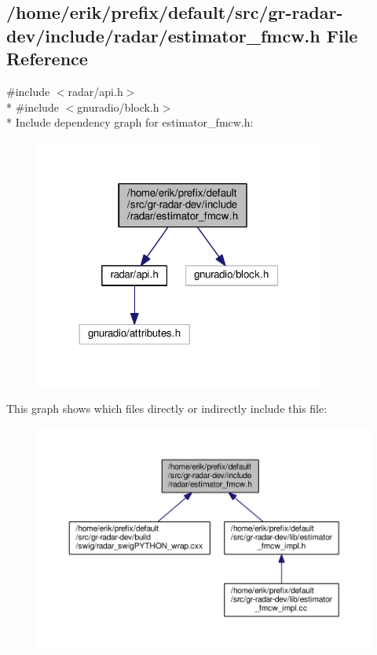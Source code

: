 \subsection{/home/erik/prefix/default/src/gr-\/radar-\/dev/include/radar/estimator\+\_\+fmcw.h File Reference}
\label{estimator__fmcw_8h}
{\ttfamily \#include $<$radar/api.\+h$>$}\\*
{\ttfamily \#include $<$gnuradio/block.\+h$>$}\\*
Include dependency graph for estimator\+\_\+fmcw.\+h\+:
\nopagebreak
\begin{figure}[H]
\begin{center}
\leavevmode
\includegraphics[width=270pt]{d8/dbf/estimator__fmcw_8h__incl}
\end{center}
\end{figure}
This graph shows which files directly or indirectly include this file\+:
\nopagebreak
\begin{figure}[H]
\begin{center}
\leavevmode
\includegraphics[width=350pt]{db/d5d/estimator__fmcw_8h__dep__incl}
\end{center}
\end{figure}
